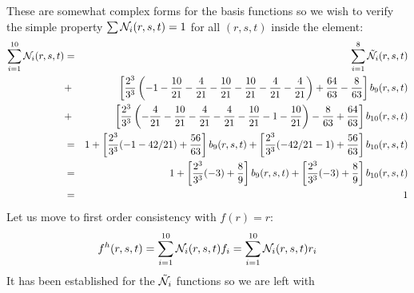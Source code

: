 These are somewhat complex forms for the basis functions so we wish to verify the simple property $\sum {\mathcal{N}}_i(r,s,t) =1$ 
for all $(r,s,t)$ inside the element:
\begin{eqnarray}
\sum_{i=1}^{10} {\mathcal{N}}_i(r,s,t)  
&=& \sum_{i=1}^{8} \tilde{{\mathcal{N}}}_i(r,s,t) \nonumber\\
&+& \left[\frac{2^3}{3^3} \left(-1 -\frac{10}{21} -\frac{4}{21} -\frac{10}{21} -\frac{10}{21} -\frac{4}{21} -\frac{4}{21}\right) + \frac{64}{63} -\frac{8}{63} \right] b_9(r,s,t) \nonumber\\
&+& \left[\frac{2^3}{3^3} \left(-\frac{4}{21} -\frac{10}{21} -\frac{4}{21} -\frac{4}{21} -\frac{10}{21} -1 -\frac{10}{21} \right) -\frac{8}{63} + \frac{64}{63} \right] b_{10}(r,s,t) \nonumber\\
&=& 1 + \left[\frac{2^3}{3^3} (-1 -42/21) +\frac{56}{63}  \right] b_9(r,s,t) 
+ \left[\frac{2^3}{3^3} (-42/21 -1)  + \frac{56}{63} \right] b_{10}(r,s,t) \nonumber\\
&=& 1 + \left[\frac{2^3}{3^3} (-3) + \frac{8}{9} \right] b_9(r,s,t) 
+ \left[\frac{2^3}{3^3} (-3)  + \frac{8}{9} \right] b_{10}(r,s,t) \nonumber\\
&=& 1
\end{eqnarray}
Let us move to first order consistency with $f(r)=r$:
\begin{eqnarray}
f^h(r,s,t)
=\sum_{i=1}^{10} {\mathcal{N}}_i(r,s,t) f_i
=\sum_{i=1}^{10} {\mathcal{N}}_i(r,s,t) r_i 
\end{eqnarray}
It has been established for the $\tilde{{\mathcal{N}}}_i$ functions so we are left with
